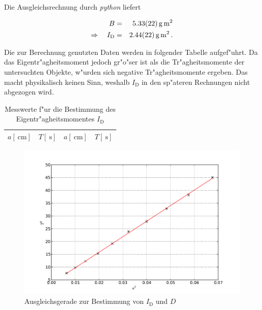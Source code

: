 		Die Ausgleichsrechnung durch \emph{python} liefert

		\begin{eqnarray*}
			B & = & \SI{5.33 (22)}{\gram \meter \squared} \\
			\Rightarrow \quad I_\mathrm{D} & = & \SI{2.44 (22)}{\gram \meter \squared} \,.
		\end{eqnarray*}

		Die zur Berechnung genutzten Daten werden in folgender Tabelle aufgef"uhrt.
		Da das Eigentr"agheitsmoment jedoch gr"o"ser ist als die Tr"agheitsmomente der untersuchten Objekte, w"urden sich negative Tr"agheitsmomente ergeben.
		Das macht physikalisch keinen Sinn, weshalb $I_\mathrm{D}$ in den sp"ateren Rechnungen nicht abgezogen wird.

		\begin{table}[h!]
			\begin{center}
				\label{tabelle:winkelrichtgroesse}
				\caption{Messwerte f"ur die Bestimmung des Eigentr"agheitsmomentes $I_\mathrm{D}$}
				\begin{tabular}{|c|c||c|c|}
					\hline
					$a [\SI{}{\centi \meter}]$ & $T [\SI{}{\second}]$ & $a [\SI{}{\centi \meter}]$ & $T [\SI{}{\second}]$\\
					\hline 
					\hline
					
					\hline 
				\end{tabular}
			\end{center}
		\end{table}

		\begin{figure}[h!]
			\centering
			\includegraphics[width = 15cm]{img/graph2_T.pdf}
			\caption{Ausgleichsgerade zur Bestimmung von $I_\mathrm{D}$ und $D$}
			\label{fig:graph2}
		\end{figure}


